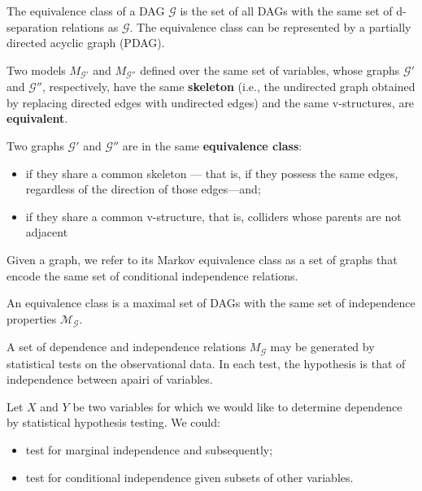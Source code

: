 The equivalence class of a DAG $\mathcal{G}$ is the set of all DAGs with the same
set of d-separation relations as $\mathcal{G}$. The equivalence class can be represented
by a partially directed acyclic graph (PDAG).

\begin{definition}
    Two models $M_\mathcal{G'}$ and $M_\mathcal{G''}$ defined over the same set
    of variables, whose graphs $\mathcal{G'}$ and $\mathcal{G''}$, respectively,
    have the same \textbf{skeleton} (i.e., the undirected graph obtained by replacing
    directed edges with undirected edges) and the same v-structures, are \textbf{equivalent}.

    Two graphs $\mathcal{G'}$ and $\mathcal{G''}$ are in the same \textbf{equivalence class}:
    \begin{itemize}
        \item if they share a common skeleton — that is, if they possess the same
              edges, regardless of the direction of those edges—and;
        \item if they share a common v-structure, that is, colliders whose parents
              are not adjacent
    \end{itemize}
\end{definition}

Given a graph, we refer to its Markov equivalence class as a set of graphs that
encode the same set of conditional independence relations.

\begin{definition}
    An equivalence class is a maximal set of DAGs with the same set of independence
    properties $\mathcal{M}_{\mathcal{G}}$.
\end{definition}

A set of dependence and independence relations $M_{\mathcal{G}}$ may be generated
by statistical tests on the observational data. In each test, the hypothesis is
that of independence between apairi of variables.

Let $X$ and $Y$ be two variables for which we would like to determine dependence
by statistical hypothesis testing. We could:
\begin{itemize}
    \item test for marginal independence and subsequently;
    \item test for conditional independence given subsets of other variables.
\end{itemize}

